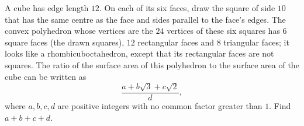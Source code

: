 A cube has edge length $12$. On each of its six faces, draw the square of side $10$ that has the same centre as the face and sides parallel to the face's edges. The convex polyhedron whose vertices are the $24$ vertices of these six squares has $6$ square faces (the drawn squares), $12$ rectangular faces and $8$ triangular faces; it looks like a rhombicuboctahedron, except that its rectangular faces are not squares. The ratio of the surface area of this polyhedron to the surface area of the cube can be written as
\[\dfrac{a+b\sqrt3+c\sqrt2}{d},\]
where $a,b,c,d$ are positive integers with no common factor greater than $1$. Find $a+b+c+d$.

